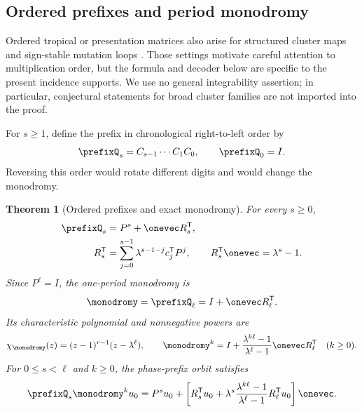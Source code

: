 \documentclass[11pt,letterpaper]{article}
\newtheorem{theorem}{Theorem}[section]
\theoremstyle{definition}
\theoremstyle{remark}
\numberwithin{equation}{section}
\begin{document}
\subsection{Ordered prefixes and period monodromy}

Ordered tropical or presentation matrices also arise for structured cluster
maps and sign-stable mutation loops
\citep{FordyHone2011,FordyHone2014,IshibashiKano2021,Kim2026}.  Those
settings motivate careful attention to multiplication order, but the formula
and decoder below are specific to the present incidence supports.  We use no
general integrability assertion; in particular, conjectural statements for
broad cluster families are not imported into the proof.

For \(s\geq1\), define the prefix in chronological right-to-left order by
\begin{equation}
 \prefixQ_s=C_{s-1}\cdots C_1C_0,
 \qquad \prefixQ_0=I.
 \label{eq:prefix-definition}
\end{equation}
Reversing this order would rotate different digits and would change the
monodromy.

\begin{theorem}[Ordered prefixes and exact monodromy]
\label{thm:ordered-monodromy}
For every \(s\geq0\),
\begin{equation}
 \begin{aligned}
 \prefixQ_s&=P^s+\onevec R_s^{\mathsf T},\\
 R_s^{\mathsf T}
  &=\sum_{j=0}^{s-1}\lambda^{s-1-j}c_j^{\mathsf T}P^j,
 \qquad
 R_s^{\mathsf T}\onevec=\lambda^s-1.
 \end{aligned}
 \label{eq:prefix-rank-one}
\end{equation}
Since \(P^\ell=I\), the one-period monodromy is
\begin{equation}
 \monodromy=\prefixQ_\ell
   =I+\onevec R_\ell^{\mathsf T}.
 \label{eq:monodromy}
\end{equation}
Its characteristic polynomial and nonnegative powers are
\begin{equation}
 \chi_{\monodromy}(z)
   =(z-1)^{r-1}(z-\lambda^\ell),
 \qquad
 \monodromy^k=I+
 \frac{\lambda^{k\ell}-1}{\lambda^\ell-1}
 \onevec R_\ell^{\mathsf T}
 \quad(k\geq0).
 \label{eq:monodromy-spectrum}
\end{equation}
For \(0\leq s<\ell\) and \(k\geq0\), the phase-prefix orbit satisfies
\begin{equation}
 \prefixQ_s\monodromy^ku_0=P^su_0+
 \left[
  R_s^{\mathsf T}u_0+
  \lambda^s\frac{\lambda^{k\ell}-1}{\lambda^\ell-1}
  R_\ell^{\mathsf T}u_0
 \right]\onevec.
 \label{eq:phase-prefix}
\end{equation}
\end{theorem}
\end{document}
